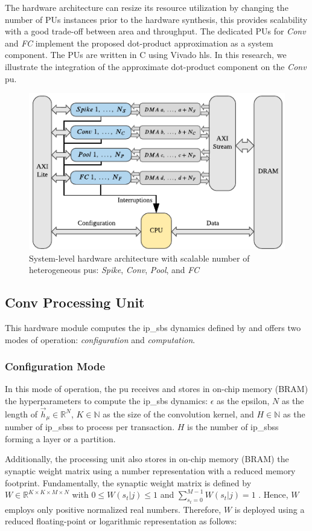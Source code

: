 The hardware architecture can resize its resource utilization by changing the number of PUs instances prior to the hardware synthesis, this provides scalability with a good trade-off between area and throughput. The dedicated PUs for \emph{Conv} and \emph{FC} implement the proposed dot-product approximation as a system component. The PUs are written in C using Vivado \gls{hls}. In this research, we illustrate the integration of the approximate dot-product component on the \emph{Conv} \gls{pu}.

\begin{figure}[b!]
	\centering
	\includegraphics[width=0.5\columnwidth]{./chapters/sbs_accelerator/figures/sbs_hw.pdf}
	\caption{System-level hardware architecture with scalable number of heterogeneous \glspl{pu}: \emph{Spike}, \emph{Conv}, \emph{Pool}, and \emph{FC}}
	\label{fig:hw_sbs}
\end{figure}

\subsection{Conv Processing Unit}
This hardware module computes the \gls{ip_sbs} dynamics defined by  and offers two modes of operation: \emph{configuration} and \emph{computation}.

\subsubsection{Configuration Mode}
In this mode of operation, the \gls{pu} receives and stores in on-chip memory (BRAM) the hyperparameters to compute the \gls{ip_sbs} dynamics: $\epsilon$ as the epsilon, $N$ as the length of $\vec{h}_\mu\in\mathbb{R}^{N}$, $K\in\mathbb{N}$ as the size of the convolution kernel, and $H\in\mathbb{N}$ as the number of \glspl{ip_sbs} to process per transaction. $H$ is the number of \glspl{ip_sbs} forming a layer or a partition.

Additionally, the processing unit also stores in on-chip memory (BRAM) the synaptic weight matrix using a number representation with a reduced memory footprint. Fundamentally, the synaptic weight matrix is defined by $W\in\mathbb{R}^{K\times K\times M\times N}$ with $0\le W(s_t|j)\le1$ and $\sum_{s_t=0}^{M-1}W(s_t|j)=1$ \cite{rotermund2019Backpropagation}. Hence, $W$ employs only positive normalized real numbers. Therefore, $W$ is deployed using a reduced floating-point or logarithmic representation as follows:

